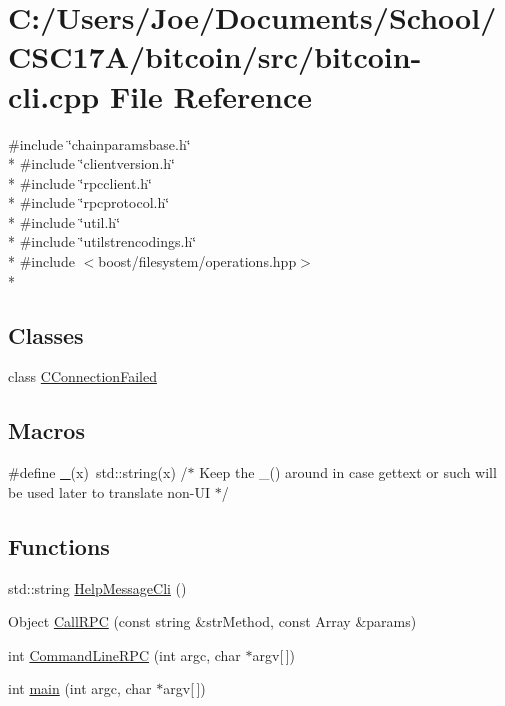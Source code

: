 \hypertarget{bitcoin-cli_8cpp}{}\section{C\+:/\+Users/\+Joe/\+Documents/\+School/\+C\+S\+C17\+A/bitcoin/src/bitcoin-\/cli.cpp File Reference}
\label{bitcoin-cli_8cpp}
{\ttfamily \#include \char`\"{}chainparamsbase.\+h\char`\"{}}\\*
{\ttfamily \#include \char`\"{}clientversion.\+h\char`\"{}}\\*
{\ttfamily \#include \char`\"{}rpcclient.\+h\char`\"{}}\\*
{\ttfamily \#include \char`\"{}rpcprotocol.\+h\char`\"{}}\\*
{\ttfamily \#include \char`\"{}util.\+h\char`\"{}}\\*
{\ttfamily \#include \char`\"{}utilstrencodings.\+h\char`\"{}}\\*
{\ttfamily \#include $<$boost/filesystem/operations.\+hpp$>$}\\*
\subsection*{Classes}
\begin{DoxyCompactItemize}
\item 
class \hyperlink{class_c_connection_failed}{C\+Connection\+Failed}
\end{DoxyCompactItemize}
\subsection*{Macros}
\begin{DoxyCompactItemize}
\item 
\#define \hyperlink{bitcoin-cli_8cpp_af20b8d139279b360b0fdeae71f8f43bc}{\+\_\+}(x)~std\+::string(x) /$\ast$ Keep the \+\_\+() around in case gettext or such will be used later to translate non-\/U\+I $\ast$/
\end{DoxyCompactItemize}
\subsection*{Functions}
\begin{DoxyCompactItemize}
\item 
std\+::string \hyperlink{bitcoin-cli_8cpp_a1132a90be0b486a0c670ea50e2bf4c17}{Help\+Message\+Cli} ()
\item 
Object \hyperlink{bitcoin-cli_8cpp_ae0b4394f271db49671cf894dbe94c484}{Call\+R\+P\+C} (const string \&str\+Method, const Array \&params)
\item 
int \hyperlink{bitcoin-cli_8cpp_a4ee23259648a971c9c05aeff8b545a6d}{Command\+Line\+R\+P\+C} (int argc, char $\ast$argv\mbox{[}$\,$\mbox{]})
\item 
int \hyperlink{bitcoin-cli_8cpp_a0ddf1224851353fc92bfbff6f499fa97}{main} (int argc, char $\ast$argv\mbox{[}$\,$\mbox{]})
\end{DoxyCompactItemize}


